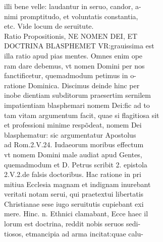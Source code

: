 \documentclass{article}
\begin{document}
\begin{pages}
                illi bene velle: laudantur in seruo, candor, a- \\
                nimi promptitudo, et voluntatis constantia, \\
                etc. Vide locum de seruitute. \\
                Ratio Propositionis, NE NOMEN DEI, ET \\
                DOCTRINA BLASPHEMET VR:grauissima est \\
                illa ratio apud pias mentes. Omnes enim ope \\
                ram dare debemus, vt nomen Domini per nos \\
                fanctificetur, quemadmodum petimus in o- \\
                ratione Dominica. Discimus deinde hinc per \\
                inobe dientiam subditorum praesertim sernilem \\
                impatientiam blasphemari nomem Dei:fic ad to \\
                tam vitam argumentum facit, quae si flagitiosa sit \\
                et professioni minime respõdeat, nomem Dei \\
                blasphematur: sic argumentatur Apostolus \\
                ad Rom.2.V.24. Iudaeorum moribus effectum \\
                vt nomem Domini male audiat apud Gentes, \\
                quemadmodum et D. Petrus scribit 2. epistola \\
                2.V.2.de falsis doctoribus. Hac ratione in pri \\
                mitiua Ecclesia magnam et indignam inurebant \\
                veritati notam serui, qui praetextui libertatis \\
                Christianae sese iugo seruitutis cupiebant exi \\
                mere. Hinc. n. Ethnici clamabant, Ecce haec il \\
                lorum est doctrina, reddit nobis seruos sedi- \\
                tiosos, etmancipia ad arma incitat:quae calu- \\

\end{pages}
\end{document}
